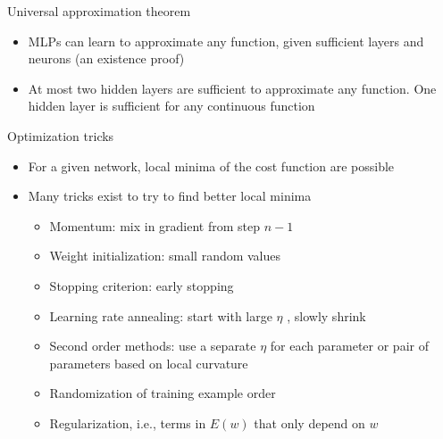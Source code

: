 \documentclass[notes]{beamer}
\providecommand{\tightlist}{%
  \setlength{\itemsep}{0pt}\setlength{\parskip}{0pt}}
\begin{document}
\begin{frame}{Universal approximation theorem}

\begin{itemize}
\tightlist
\item
  MLPs can learn to approximate any function, given sufficient layers
  and neurons (an existence proof)
\item
  At most two hidden layers are sufficient to approximate any function.
  One hidden layer is sufficient for any continuous function
\end{itemize}

\end{frame}

\begin{frame}{Optimization tricks}

\begin{itemize}
\tightlist
\item
  For a given network, local minima of the cost function are possible
\item
  Many tricks exist to try to find better local minima

  \begin{itemize}
  \tightlist
  \item
    Momentum: mix in gradient from step \(n - 1\)
  \item
    Weight initialization: small random values
  \item
    Stopping criterion: early stopping
  \item
    Learning rate annealing: start with large \(\eta\) , slowly shrink
  \item
    Second order methods: use a separate \(\eta\) for each parameter or
    pair of parameters based on local curvature
  \item
    Randomization of training example order
  \item
    Regularization, i.e., terms in \(E(w)\) that only depend on \(w\)
  \end{itemize}
\end{itemize}

\end{frame}
\end{document}
